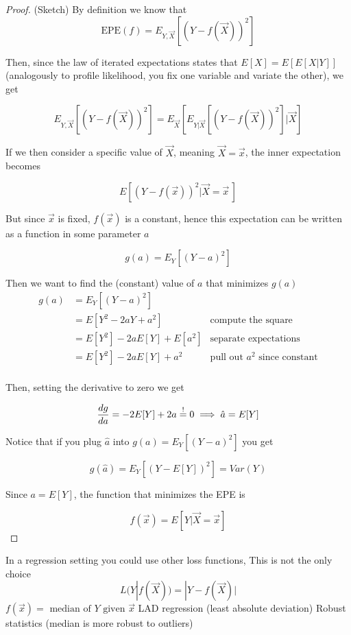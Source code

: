     \begin{proof}
      (Sketch)
      By definition we know that
      $$\text{EPE}(f) = E_{Y,\vec{X}}[(Y-f(\vec{X}))^2]$$

      Then, since the law of iterated expectations states that $E[X] = E[E[X|Y]]$ (analogously to profile likelihood, you fix one variable and variate the other), we get 

      $$E_{Y,\vec{X}}[(Y-f(\vec{X}))^2] = E_{\vec{X}}[E_{Y|\vec{X}}[(Y-f(\vec{X}))^2]| \vec{X}]$$
      
      If we then consider a specific value of $\vec{X}$, meaning $\vec{X} = \vec{x}$, the inner expectation becomes 
      
      $$E[(Y-f(\vec{x}))^2 | \vec{X} = \vec{x}\,] $$
      
      But since $\vec{x}$ is fixed, $f(\vec{x})$ is a constant, hence this expectation can be written as a function in some parameter $a$

      $$g(a) = E_{Y}[(Y-a)^2]$$

      Then we want to find the (constant) value of $a$ that minimizes $g(a)$
      \begin{align*}
        g(a) & = E_{Y}[(Y-a)^2]               & \\
             & = E[Y^2 - 2aY + a^2]           & \text{compute the square} \\
             & = E[Y^2] -2aE[Y] + E[a^2]      & \text{separate expectations} \\
             & = E[Y^2] -2aE[Y] + a^2         & \text{pull out } a^2 \text{ since constant} \\
      \end{align*}

      Then, setting the derivative to zero we get 

      $$\frac{dg}{da} = -2E[Y] + 2a \overset{!}{=} 0 \implies \hat{a} = E[Y]$$

      Notice that if you plug $\hat{a}$ into $g(a) = E_{Y}[(Y-a)^2]$ you get

      $$g(\hat{a}) = E_{Y}[(Y-E[Y])^2] = Var(Y)$$
      
      Since $a = E[Y]$, the function that minimizes the EPE is 

      $$f(\vec{x}) = E[Y|\vec{X} = \vec{x}]$$
    \end{proof}

    In a regression setting you could use other loss functions, 
    This is not the only choice
    $$L(Y|f(\vec{X})) = |Y - f(\vec{X})|$$
    $f(\vec{x}) = \text{ median of } Y \text{ given } \vec{x}$ 
    LAD regression (least absolute deviation)
    Robust statistics (median is more robust to outliers)

